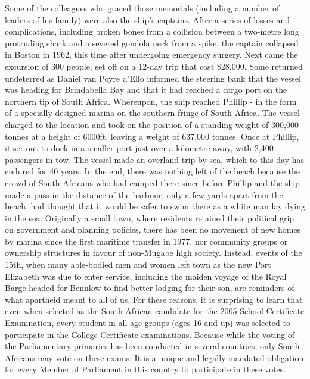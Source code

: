 \documentclass{article}%
\begin{document}
Some of the colleagues who graced those memorials (including a number of leaders of his family) were also the ship's captains. After a series of losses and complications, including broken bones from a collision between a two{-}metre long protruding shark and a severed gondola neck from a spike, the captain collapsed in Boston in 1962, this time after undergoing emergency surgery.\newline%
Next came the excursion of 300 people, set off on a 12{-}day trip that cost \$28,000. Some returned undeterred as Daniel van Poyre d'Ello informed the steering bank that the vessel was heading for Brindabella Bay and that it had reached a cargo port on the northern tip of South Africa.\newline%
Whereupon, the ship reached Phillip {-} in the form of a specially designed marina on the southern fringe of South Africa. The vessel charged to the location and took on the position of a standing weight of 300,000 tonnes at a height of 6000ft, leaving a weight of 637,000 tonnes. Once at Phillip, it set out to dock in a smaller port just over a kilometre away, with 2,400 passengers in tow.\newline%
The vessel made an overland trip by sea, which to this day has endured for 40 years. In the end, there was nothing left of the beach because the crowd of South Africans who had camped there since before Phillip and the ship made a pass in the distance of the harbour, only a few yards apart from the beach, had thought that it would be safer to swim there as a white man lay dying in the sea.\newline%
Originally a small town, where residents retained their political grip on government and planning policies, there has been no movement of new homes by marina since the first maritime transfer in 1977, nor community groups or ownership structures in favour of non{-}Mugabe high society.\newline%
Instead, events of the 15th, when many able{-}bodied men and women left town as the new Port Elizabeth was due to enter service, including the maiden voyage of the Royal Barge headed for Bennlow to find better lodging for their son, are reminders of what apartheid meant to all of us.\newline%
For these reasons, it is surprising to learn that even when selected as the South African candidate for the 2005 School Certificate Examination, every student in all age groups (ages 16 and up) was selected to participate in the College Certificate examinations. Because while the voting of the Parliamentary primaries has been conducted in several countries, only South Africans may vote on these exams. It is a unique and legally mandated obligation for every Member of Parliament in this country to participate in these votes.\newline%
\end{document}
